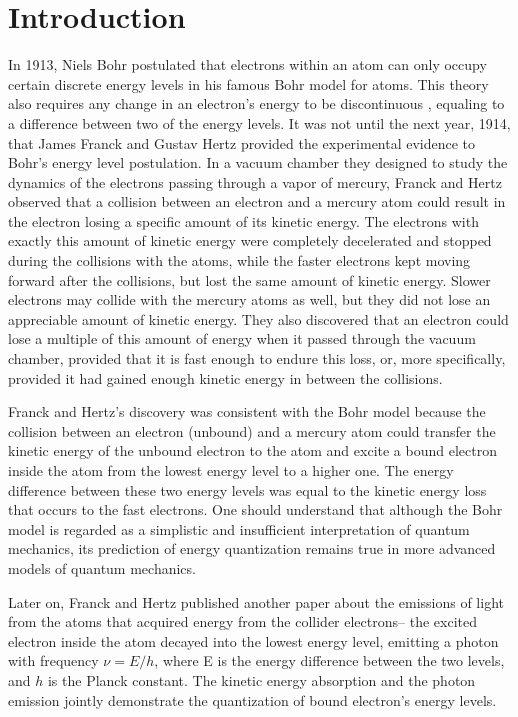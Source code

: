 \documentclass[prb,preprint]{revtex4-1}
\begin{document}
\maketitle 

\section{Introduction}
\label{introduction}

In 1913, Niels Bohr postulated that electrons within an atom can only occupy certain discrete energy levels in his famous Bohr model for atoms. This theory also requires any change in an electron's energy to be discontinuous , equaling to a difference between two of the energy levels. It was not until the next year, 1914, that James Franck and Gustav Hertz provided the experimental evidence to Bohr's energy level postulation. In a vacuum chamber they designed to study the dynamics of the electrons passing through a vapor of mercury, Franck and Hertz observed that a collision between an electron and a mercury atom could result in the electron losing a specific amount of its kinetic energy. The electrons with exactly this amount of kinetic energy were completely decelerated and stopped during the collisions with the atoms, while the faster electrons kept moving forward after the collisions, but lost the same amount of kinetic energy. Slower electrons may collide with the mercury atoms as well, but they did not lose an appreciable amount of kinetic energy.  They also discovered that an electron could lose a multiple of this amount of energy when it passed through the vacuum chamber, provided that it is fast enough to endure this loss, or, more specifically, provided it had gained enough kinetic energy in between the collisions.

Franck and Hertz's discovery was consistent with the Bohr model because the collision between an electron (unbound) and a mercury atom could transfer the kinetic energy of the unbound electron to the atom and excite a bound electron inside the atom from the lowest energy level to a higher one. The energy difference between these two energy levels was equal to the kinetic energy loss that occurs to the fast electrons. One should understand that although the Bohr model is regarded as a simplistic and insufficient interpretation of quantum mechanics, its prediction of energy quantization remains true in more advanced models of quantum mechanics.

Later on, Franck and Hertz published another paper about the emissions of light from the atoms that acquired energy from the collider electrons-- the excited electron inside the atom decayed into the lowest energy level, emitting a photon with frequency $\nu=E/h$, where E is the energy difference between the two levels, and $h$ is the Planck constant. The kinetic energy absorption and the photon emission jointly demonstrate the quantization of bound electron's energy levels.
\end{document}
